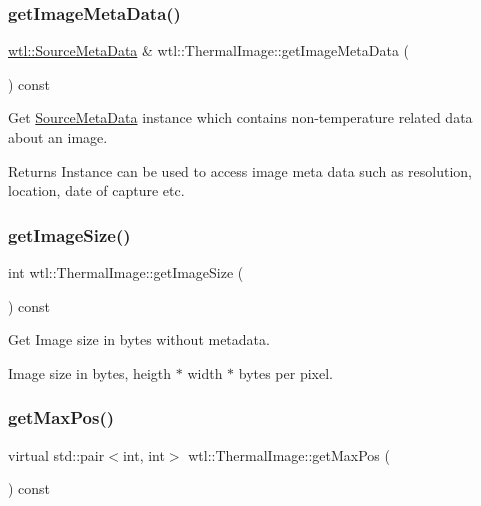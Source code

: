 \subsubsection{\texorpdfstring{get\+Image\+Meta\+Data()}{getImageMetaData()}}
{\footnotesize\ttfamily \hyperlink{classwtl_1_1_source_meta_data}{wtl\+::\+Source\+Meta\+Data} \& wtl\+::\+Thermal\+Image\+::get\+Image\+Meta\+Data (\begin{DoxyParamCaption}{ }\end{DoxyParamCaption}) const}



Get \hyperlink{classwtl_1_1_source_meta_data}{Source\+Meta\+Data} instance which contains non-\/temperature related data about an image. 

\begin{DoxyReturn}{Returns}
Instance can be used to access image meta data such as resolution, location, date of capture etc. 
\end{DoxyReturn}
\mbox{\label{classwtl_1_1_thermal_image_aef736a8394a7899e696f4dcf991139ea}} 
\subsubsection{\texorpdfstring{get\+Image\+Size()}{getImageSize()}}
{\footnotesize\ttfamily int wtl\+::\+Thermal\+Image\+::get\+Image\+Size (\begin{DoxyParamCaption}{ }\end{DoxyParamCaption}) const}



Get Image size in bytes without metadata. 

Image size in bytes, heigth $\ast$ width $\ast$ bytes per pixel. \mbox{\label{classwtl_1_1_thermal_image_af5c649f864be43c3f0f4f9bacc047345}} 
\subsubsection{\texorpdfstring{get\+Max\+Pos()}{getMaxPos()}}
{\footnotesize\ttfamily virtual std\+::pair$<$int, int$>$ wtl\+::\+Thermal\+Image\+::get\+Max\+Pos (\begin{DoxyParamCaption}{ }\end{DoxyParamCaption}) const\hspace{0.3cm}{\ttfamily [pure virtual]}}



